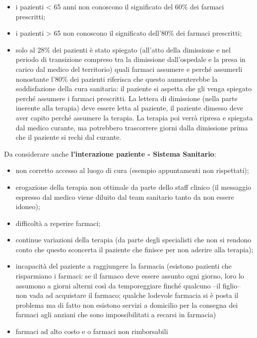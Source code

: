 \begin{itemize}
\item
  i pazienti \textless{} 65 anni non conoscono il significato del 60\%
  dei farmaci prescritti;
\item
  i pazienti \textgreater{} 65 non conoscono il significato dell'80\%
  dei farmaci prescritti;
\item
  solo al 28\% dei pazienti è stato spiegato (all'atto della dimissione
  e nel periodo di transizione compreso tra la dimissione dall'ospedale
  e la presa in carico dal medico del territorio) quali farmaci assumere
  e perché assumerli nonostante l'80\% dei pazienti riferisca che questo
  aumenterebbe la soddisfazione della cura sanitaria: il paziente si
  aspetta che gli venga spiegato perché assumere i farmaci prescritti.
  La lettera di dimissione (nella parte inerente alla terapia) deve
  essere letta al paziente, il paziente dimesso deve aver capito perché
  assumere la terapia. La terapia poi verrà ripresa e spiegata dal
  medico curante, ma potrebbero trascorrere giorni dalla dimissione
  prima che il paziente si rechi dal curante.
\end{itemize}

Da considerare anche \textbf{l'interazione paziente - Sistema
Sanitario}:

\begin{itemize}
\item
  non corretto accesso al luogo di cura (esempio appuntamenti non
  rispettati);
\item
  erogazione della terapia non ottimale da parte dello staff clinico (il
  messaggio espresso dal medico viene diluito dal team sanitario tanto
  da non essere idoneo);
\item
  difficoltà a reperire farmaci;
\item
  continue variazioni della terapia (da parte degli specialisti che non
  si rendono conto che questo sconcerta il paziente che finisce per non
  aderire alla terapia);
\item
  incapacità del paziente a raggiungere la farmacia (esistono pazienti
  che risparmiano i farmaci: se il farmaco deve essere assunto ogni
  giorno, loro lo assumono a giorni alterni così da temporeggiare finché
  qualcuno --il figlio-- non vada ad acquistare il farmaco; qualche
  lodevole farmacia si è posta il problema ma di fatto non esistono
  servizi a domicilio per la consegna dei farmaci agli anziani che sono
  impossibilitati a recarsi in farmacia)
\item
  farmaci ad alto costo e o farmaci non rimborsabili
\end{itemize}

